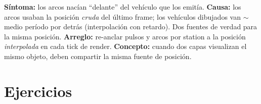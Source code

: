 \documentclass[11pt,a4paper]{article}
\begin{document}
\begin{casobox}
\textbf{Síntoma:} los arcos nacían ``delante'' del vehículo que los emitía.
\textbf{Causa:} los arcos usaban la posición \emph{cruda} del último frame; los
vehículos dibujados van $\sim$medio período por detrás (interpolación con
retardo). Dos fuentes de verdad para la misma posición. \textbf{Arreglo:}
re-anclar pulsos y arcos por station a la posición \emph{interpolada} en cada
tick de render. \textbf{Concepto:} cuando dos capas visualizan el mismo objeto,
deben compartir la misma fuente de posición.
\end{casobox}

\section{Ejercicios}
\end{document}
